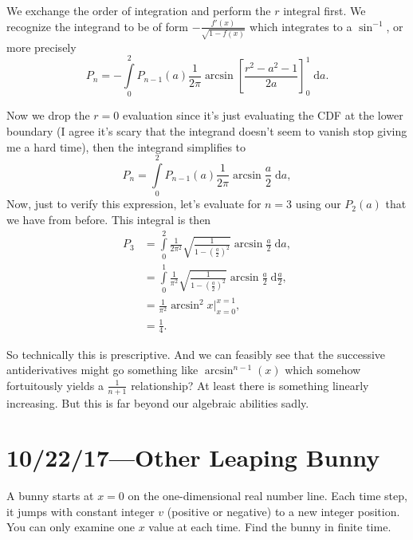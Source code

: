\documentclass[12pt]{report}
\begin{document}
We exchange the order of integration and perform the $r$ integral first. We
recognize the integrand to be of form $-\frac{f'(x)}{\sqrt{1 - f(x)}}$ which
integrates to a $\sin^{-1}$, or more precisely
\begin{equation}
    P_n = -\int\limits_{0}^{2}P_{n - 1}(a)
        \frac{1}{2\pi} \arcsin \left[
            \frac{r^2 - a^2 - 1}{2a}
        \right]_0^1\;\mathrm{d}a.
\end{equation}

Now we drop the $r = 0$ evaluation since it's just evaluating the CDF at the
lower boundary (I agree it's scary that the integrand doesn't seem to vanish
stop giving me a hard time), then the integrand simplifies to
\begin{equation}
    P_n = \int\limits_{0}^{2}P_{n - 1}(a)
        \frac{1}{2\pi} \arcsin \frac{a}{2}\;\mathrm{d}a,
\end{equation}
Now, just to verify this expression, let's evaluate for $n = 3$ using our
$P_2(a)$ that we have from before. This integral is then
\begin{align}
    P_3 &= \int\limits_{0}^{2}\frac{1}{2\pi^2}
        \sqrt{\frac{1}{1 - \left( \frac{a}{2} \right)^2}}
        \arcsin \frac{a}{2}\;\mathrm{d}a,\nonumber\\
        &= \int\limits_{0}^{1}\frac{1}{\pi^2}
            \sqrt{\frac{1}{1 - \left( \frac{a}{2} \right)^2}}
            \arcsin \frac{a}{2}\;\mathrm{d}\frac{a}{2},\nonumber\\
        &= \frac{1}{\pi^2} \arcsin^2 x\Bigg|_{x=0}^{x=1},\nonumber\\
        &= \frac{1}{4}.
\end{align}

So technically this is prescriptive. And we can feasibly see that the successive
antiderivatives might go something like $\arcsin^{n-1}(x)$ which somehow
fortuitously yields a $\frac{1}{n + 1}$ relationship? At least there is
something linearly increasing. But this is far beyond our algebraic abilities
sadly.

\chapter{10/22/17---Other Leaping Bunny}

A bunny starts at $x = 0$ on the one-dimensional real number line. Each time
step, it jumps with constant integer $v$ (positive or negative) to a new integer
position. You can only examine one $x$ value at each time. Find the bunny in
finite time.
\end{document}
